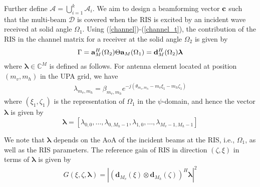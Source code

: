 Further define $\mathcal{A} = {{\bigcup}_{i=1}^k}\mathcal{A}_i$. 
%
%
We aim to design a beamforming vector ${\bf{c}}$ such that the multi-beam $\mathcal{D}$ is covered when the RIS is excited by an incident wave received at solid angle $\Omega_1$. Using (\ref{channel})-(\ref{channel_t}), the contribution of the RIS in the channel matrix for a receiver at the solid angle $\Omega_2$ is given by
\begin{align}
    \Gamma = {\bf{a}}^{H}_{M}(\Omega_2) \Theta {\bf{a}}_{M}(\Omega_1) = {\bf{d}}^H_M(\Omega_2) \boldsymbol{\lambda}  
\end{align}
where  $\boldsymbol{\lambda} \in \mathbb{C}^M$  is defined as follows. For antenna element located at position $(m_v, m_h)$ in the UPA grid,  we have 
\begin{align}
    \lambda_{m_v, m_h} = \beta_{m_v, m_h}e^{-j(\theta_{m_v, m_h}- m_v\xi_{1} - m_h\zeta_{1})}
\end{align} 
where $(\xi_{1}, \zeta_{1})$ is the representation of $\Omega_1$ in the $\psi$-domain, and hence the vector $\boldsymbol{\lambda}$ is given by
\begin{equation}
    \boldsymbol{\lambda} = [\lambda_{0,0}, \ldots, \lambda_{0,M_h-1}, \lambda_{1,0}, \ldots, \lambda_{M_v-1, M_h-1}]
\end{equation}

We note that $\boldsymbol{\lambda}$ depends on the AoA of the incident beams at the RIS, i.e., $\Omega_1$, as well as the RIS parameters. The reference gain of RIS in direction $(\zeta, \xi) $ in terms of $\boldsymbol{\lambda}$ is given by 
\begin{align}
    G\left(\xi, \zeta, \boldsymbol{\lambda} \right) =\left|\left(\mathbf{d}_{M_{v}}\left(\xi\right)\otimes\mathbf{d}_{M_{h}}\left(\zeta\right)  \right)^{H} \boldsymbol{\lambda} \right|^{2}
\end{align}

